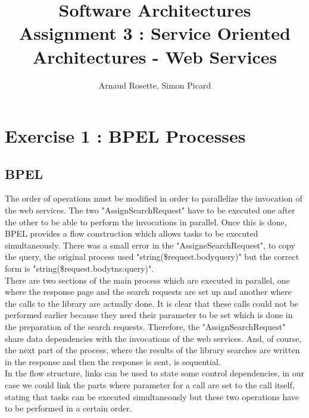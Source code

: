 \documentclass[a4paper,10pt]{article}
\title{Software Architectures\\ Assignment 3 : Service Oriented Architectures - Web Services}
\author{Arnaud Rosette, Simon Picard}
\begin{document}
\maketitle
\section{Exercise 1 : BPEL Processes}
\subsection{BPEL}
The order of operations must be modified in order to parallelize the invocation of the web services. The two "AssignSearchRequest" have to be executed one  after the other to be able to perform the invocations in parallel. Once this is done, BPEL provides a flow construction which allows tasks to be executed simultaneously. There was a small error in the "AssigneSearchRequest", to copy the query, the original process used "string(\$request.body\/\/query)" but the correct form is "string(\$request.body\/\/tns:query)".\\

There are two sections of the main process which are executed in parallel, one where the response page and the search requests are set up and another where the calls to the library are actually done. It is clear that these calls could not be performed earlier because they need their parameter to be set which is done in the preparation of the search requests. Therefore, the "AssignSearchRequest" share data dependencies with the invocations of the web services. And, of course, the next part of the process, where the results of the library searches are written in the response and then the response is sent, is sequential.\\

In the flow structure, links can be used to state some control dependencies, in our case we could link the parts where parameter for a call are set to the call itself, stating that tasks can be executed simultaneously but these two operations have to be performed in a certain order.
\end{document}

